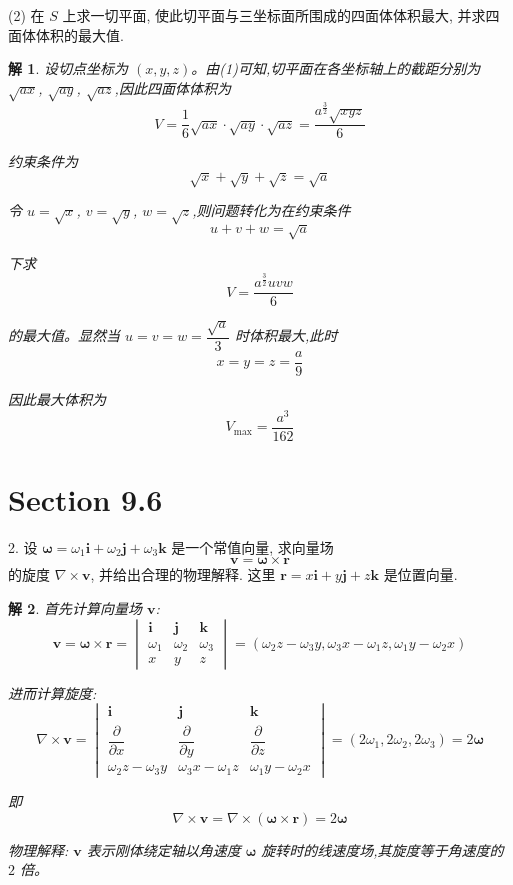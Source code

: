\documentclass[a4paper,12pt]{article}
\newtheorem*{sol}{解}
\begin{document}
(2) 在 $S$ 上求一切平面, 使此切平面与三坐标面所围成的四面体体积最大, 并求四面体体积的最大值.
\begin{sol}
    设切点坐标为 $(x,y,z)$。由(1)可知,切平面在各坐标轴上的截距分别为 $\sqrt{ax}$, $\sqrt{ay}$, $\sqrt{az}$,因此四面体体积为
    $$V=\dfrac{1}{6}\sqrt{ax}\cdot\sqrt{ay}\cdot\sqrt{az}=\dfrac{a^{\frac{3}{2}}\sqrt{xyz}}{6}$$

    约束条件为
    $$\sqrt{x} + \sqrt{y} + \sqrt{z} = \sqrt{a}$$

    令 $u=\sqrt{x}$, $v=\sqrt{y}$, $w=\sqrt{z}$,则问题转化为在约束条件
    $$u+v+w=\sqrt{a}$$

    下求
    $$V=\dfrac{a^{\frac{3}{2}}uvw}{6}$$

    的最大值。显然当 $u=v=w=\dfrac{\sqrt{a}}{3}$ 时体积最大,此时
    $$x=y=z=\dfrac{a}{9}$$

    因此最大体积为
    $$V_{\max}=\dfrac{a^3}{162}$$
\end{sol}

\section*{Section 9.6}

2. 设 $\boldsymbol{\omega} = \omega_1 \boldsymbol{i} + \omega_2 \boldsymbol{j} + \omega_3 \boldsymbol{k}$ 是一个常值向量, 求向量场
$$
    \boldsymbol{v} = \boldsymbol{\omega} \times \boldsymbol{r}
$$
的旋度 $\nabla \times \boldsymbol{v}$, 并给出合理的物理解释. 这里 $\boldsymbol{r} = x\boldsymbol{i} + y\boldsymbol{j} + z\boldsymbol{k}$ 是位置向量.
\begin{sol}
    首先计算向量场 $\boldsymbol{v}$:
    $$\boldsymbol{v}=\boldsymbol{\omega}\times \boldsymbol{r}=\begin{vmatrix}
            \boldsymbol{i} & \boldsymbol{j} & \boldsymbol{k} \\
            \omega_1       & \omega_2       & \omega_3       \\
            x              & y              & z
        \end{vmatrix}=(\omega_2z-\omega_3y,\omega_3x-\omega_1z,\omega_1y-\omega_2x)$$

    进而计算旋度:
    $$\nabla\times \boldsymbol{v}=\begin{vmatrix}
            \boldsymbol{i}      & \boldsymbol{j}      & \boldsymbol{k}      \\
            \dfrac{\partial}{\partial x}          & \dfrac{\partial}{\partial y}          & \dfrac{\partial}{\partial z}          \\
            \omega_2z-\omega_3y & \omega_3x-\omega_1z & \omega_1y-\omega_2x
        \end{vmatrix}=(2\omega_1,2\omega_2,2\omega_3)=2\boldsymbol{\omega}$$

    即
    $$\nabla\times \boldsymbol{v}=\nabla\times(\boldsymbol{\omega}\times \boldsymbol{r})=2\boldsymbol{\omega}$$

    物理解释: $\boldsymbol{v}$ 表示刚体绕定轴以角速度 $\boldsymbol{\omega}$ 旋转时的线速度场,其旋度等于角速度的 $2$ 倍。
\end{sol}
\end{document}
